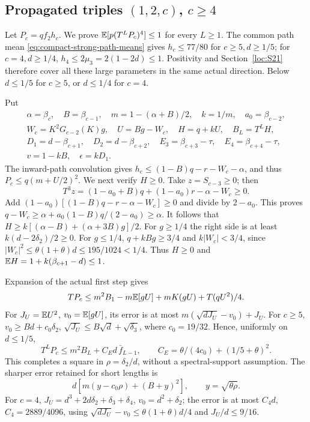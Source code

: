 \subsection[Propagated triples (1,2,c), c >= 4]{Propagated triples $(1,2,c)$, $c\ge4$}\label{loc:S26}
Let $P_c=qf_2h_c$. We prove $\mathbb E[p(T^LP_c)^4]\le1$ for every $L\ge1$.
The common path mean \eqref{eq:compact-strong-path-means} gives
$h_c\le77/80$ for $c\ge5,d\ge1/5$; for $c=4,d\ge1/4$,
$h_4\le2\mu_3=2(1-2d)\le1$.
Positivity and Section~\ref{loc:S21} therefore cover all these large
parameters in the same actual direction. Below $d\le1/5$ for $c\ge5$,
or $d\le1/4$ for $c=4$.

Put
\begin{gather*}
 \alpha=\beta_c,\quad B=\beta_{c-1},\quad
 m=1-(\alpha+B)/2,\quad k=1/m,\quad a_0=\beta_{c-2},\\
 W_c=K^2G_{c-2}(K)g,\quad U=Bg-W_c,\quad H=q+kU,\quad B_L=T^LH,\\
 D_1=d-\beta_{c+1},\quad D_2=d-\beta_{c+2},\quad
 E_3=\beta_{c+3}-\tau,\quad E_4=\beta_{c+4}-\tau,\\
 v=1-kB,\quad\epsilon=kD_1.
\end{gather*}
The inward-path convolution gives
$h_c\le(1-B)q-r-W_c-\alpha$, and thus
$P_c\le q(m+U/2)^2$.
We next verify $H\ge0$.
Take $z=S_{c-3}\ge0$; then
\[
 T^3z=(1-a_0+B)q+(1-a_0)r-\alpha-W_c\ge0.
\]
Add $(1-a_0)[(1-B)q-r-\alpha-W_c]\ge0$ and divide by $2-a_0$.
This proves $q-W_c\ge\alpha+a_0(1-B)q/(2-a_0)\ge\alpha$.
It follows that $H\ge k[(\alpha-B)+(\alpha+3B)g]/2$.
For $g\ge1/4$ the right side is at least $k(d-2\delta_{2})/2\ge0$.
For $g\le1/4$, $q+kBg\ge3/4$ and
$k|W_c|<3/4$, since
$|W_c|^2\le\theta(1+\theta)d\le195/1024<1/4$.
Thus $H\ge0$ and $\mathbb E H=1+k(\beta_{c+1}-d)\le1$.

Expansion of the actual first step gives
\[
 TP_c\le m^2B_1-m\mathbb E[gU]+mK(gU)+T(qU^2)/4.
\]
For $J_U=\mathbb E U^2$, $v_0=\mathbb E[gU]$, its error is at most
$m(\sqrt{dJ_U}-v_0)+J_U$.
For $c\ge5$,
$v_0\ge Bd+c_0\delta_{2}$, $\sqrt{J_U}\le B\sqrt d+\sqrt{\delta_{3}}$,
where $c_0=19/32$. Hence, uniformly on $d\le1/5$,
\begin{equation}\label{eq:compact-12c-error}
 T^LP_c\le m^2B_L+C_Ed\,\bar f_{L-1},\qquad
 C_E=\theta/(4c_0)+(1/5+\theta)^2.
\end{equation}
This completes a square in $\rho=\delta_{2}/d$, without a spectral-support
assumption. The sharper error retained for short lengths is
\begin{equation}\label{eq:compact-12c-rho-error}
 d[m(y-c_0\rho)+(B+y)^2],\qquad y=\sqrt{\theta\rho}.
\end{equation}
For $c=4$, $J_U=d^3+2d\delta_{2}+\delta_{3}+\delta_{4}$, $v_0=d^2+\delta_{2}$;
the error is at most $C_4d$, $C_4=2889/4096$, using
$\sqrt{dJ_U}-v_0\le\theta(1+\theta)d/4$ and $J_U/d\le9/16$.

